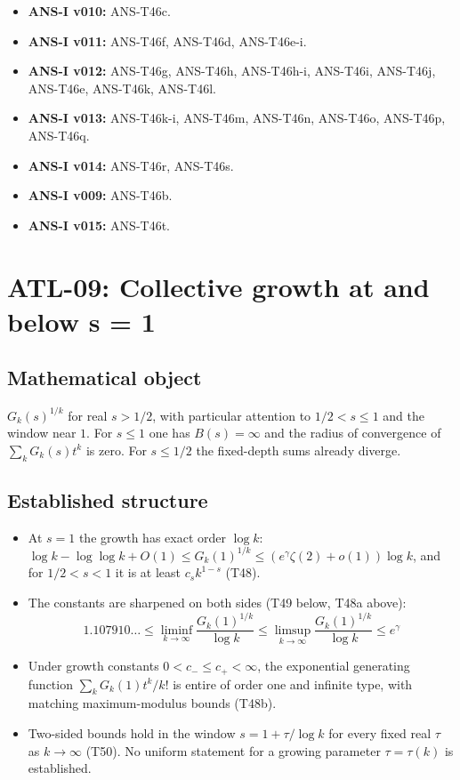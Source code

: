 \documentclass[
  11pt,
]{article}
\providecommand{\tightlist}{%
  \setlength{\itemsep}{0pt}\setlength{\parskip}{0pt}}
\begin{document}
\begin{itemize}
\tightlist
\item
  \textbf{ANS-I v010:} ANS-T46c.
\item
  \textbf{ANS-I v011:} ANS-T46f, ANS-T46d, ANS-T46e-i.
\item
  \textbf{ANS-I v012:} ANS-T46g, ANS-T46h, ANS-T46h-i, ANS-T46i,
  ANS-T46j, ANS-T46e, ANS-T46k, ANS-T46l.
\item
  \textbf{ANS-I v013:} ANS-T46k-i, ANS-T46m, ANS-T46n, ANS-T46o,
  ANS-T46p, ANS-T46q.
\item
  \textbf{ANS-I v014:} ANS-T46r, ANS-T46s.
\item
  \textbf{ANS-I v009:} ANS-T46b.
\item
  \textbf{ANS-I v015:} ANS-T46t.
\end{itemize}

\hypertarget{atl-09-collective-growth-at-and-below-s-1}{%
\section{ATL-09: Collective growth at and below s =
1}\label{atl-09-collective-growth-at-and-below-s-1}}

\hypertarget{mathematical-object-8}{%
\subsection{Mathematical object}\label{mathematical-object-8}}

\(G_k(s)^{1/k}\) for real \(s>1/2\), with particular attention to
\(1/2<s\le1\) and the window near \(1\). For \(s\le1\) one has
\(B(s)=\infty\) and the radius of convergence of \(\sum_kG_k(s)t^k\) is
zero. For \(s\le1/2\) the fixed-depth sums already diverge.

\hypertarget{established-structure-7}{%
\subsection{Established structure}\label{established-structure-7}}

\begin{itemize}
\tightlist
\item
  At \(s=1\) the growth has exact order \(\log k\):
  \(\log k-\log\log k+O(1)\le G_k(1)^{1/k}\le(e^{\gamma}\zeta(2)+o(1))\log k\),
  and for \(1/2<s<1\) it is at least \(c_sk^{1-s}\) (T48).
\item
  The constants are sharpened on both sides (T49 below, T48a above):
  \[\boxed{1.107910\ldots\le\liminf_{k\to\infty}\frac{G_k(1)^{1/k}}{\log k}\le\limsup_{k\to\infty}\frac{G_k(1)^{1/k}}{\log k}\le e^{\gamma}}\]
\item
  Under growth constants \(0<c_-\le c_+<\infty\), the exponential
  generating function \(\sum_kG_k(1)t^k/k!\) is entire of order one and
  infinite type, with matching maximum-modulus bounds (T48b).
\item
  Two-sided bounds hold in the window \(s=1+\tau/\log k\) for every
  fixed real \(\tau\) as \(k\to\infty\) (T50). No uniform statement for
  a growing parameter \(\tau=\tau(k)\) is established.
\end{itemize}
\end{document}
